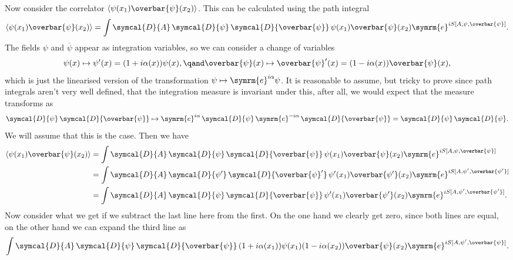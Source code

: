 \documentclass[fleqn]{NotesClass}
\newcommand{\e}{\symrm{e}}
\newcommand{\diracadjoint}[1]{\overbar{#1}}
\newcommand{\DL}[1]{\symcal{D}{#1}}
\newcommand{\DD}[1]{\,\symcal{D}{#1}}
\DeclarePairedDelimiter{\correlator}{\langle}{\rangle}
\begin{document}
    Now consider the correlator \(\correlator{\psi(x_1) \diracadjoint{\psi}(x_2)}\).
    This can be calculated using the path integral
    \begin{equation}
        \correlator{\psi(x_1) \diracadjoint{\psi}(x_2)} = \int \DL{A} \DD{\psi} \DD{\diracadjoint{\psi}} \, \psi(x_1) \diracadjoint{\psi}(x_2) \e^{iS[A, \psi, \diracadjoint{\psi}]}.
    \end{equation}
    The fields \(\psi\) and \(\diracadjoint{\psi}\) appear as integration variables, so we can consider a change of variables
    \begin{equation}
        \psi(x) \mapsto \psi'(x) = (1 + i\alpha(x))\psi(x), \qand \diracadjoint{\psi}(x) \mapsto \diracadjoint{\psi}'(x) = (1 - i\alpha(x))\diracadjoint{\psi}(x),
    \end{equation}
    which is just the linearised version of the transformation \(\psi \mapsto \e^{i\alpha}\psi\).
    It is reasonable to assume, but tricky to prove since path integrals aren't very well defined, that the integration measure is invariant under this, after all, we would expect that the measure transforms as
    \begin{equation}
        \DL{\psi}\DD{\diracadjoint{\psi}} \mapsto \e^{i\alpha}\DD{\psi} \, \e^{-i\alpha}\DD{\diracadjoint{\psi}} = \DL{\psi} \DD{\psi}.
    \end{equation}
    We will assume that this is the case.
    Then we have
    \begin{align}
        \correlator{\psi(x_1) \diracadjoint{\psi}(x_2)} &= \int \DL{A} \DD{\psi} \DD{\diracadjoint{\psi}} \, \psi(x_1) \diracadjoint{\psi}(x_2) \e^{iS[A, \psi, \diracadjoint{\psi}]}\\
        &= \int \DL{A} \DD{\psi'} \DD{\diracadjoint{\psi}'} \, \psi'(x_1) \diracadjoint{\psi'}(x_2) \e^{iS[A, \psi', \diracadjoint{\psi'}]}\\
        &= \int \DL{A} \DD{\psi} \DD{\diracadjoint{\psi}} \, \psi'(x_1) \diracadjoint{\psi'}(x_2) \e^{iS[A, \psi', \diracadjoint{\psi'}]}.
    \end{align}
    Now consider what we get if we subtract the last line here from the first.
    On the one hand we clearly get zero, since both lines are equal, on the other hand we can expand the third line as
    \begin{equation}
        \int \DL{A} \DD{\psi} \DD{\diracadjoint{\psi}} \, (1 + i\alpha(x_1))\psi(x_1) (1 - i\alpha(x_2))\diracadjoint{\psi}(x_2) \e^{iS[A, \psi', \diracadjoint{\psi}]}.
    \end{equation}
\end{document}
